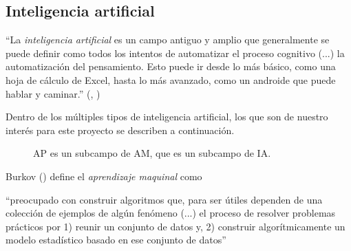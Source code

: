 \subsection {Inteligencia artificial}\label{subsec:intela}
\begin{displayquote}
``La \emph{inteligencia artificial} es un campo antiguo y amplio que generalmente se puede definir como todos los intentos de automatizar el proceso cognitivo (...) la automatización del pensamiento. Esto puede ir desde lo más básico, como una hoja de cálculo de Excel, hasta lo más avanzado, como un androide que puede hablar y caminar.'' (\citeauthor{cho18}, \citeyear{cho18})
\end{displayquote}

Dentro de los múltiples tipos de inteligencia artificial, los que son de nuestro interés para este proyecto se describen a continuación.

\begin{wrapfigure}[11]{r}[0cm]{2.66cm}
	\caption[Inteligencia artificial]{AP es un subcampo de AM, que es un subcampo de IA.}\label{FIG:IA}
\end{wrapfigure}
Burkov (\citeyear{burk19}) define el \emph{aprendizaje maquinal} como
\begin{displayquote}
``preocupado con construir algoritmos que, para ser útiles dependen de una colección de ejemplos de algún fenómeno (...) el proceso de resolver problemas prácticos por 1) reunir un conjunto de datos y, 2) construir algorítmicamente un modelo estadístico basado en ese conjunto de datos''
\end{displayquote}

